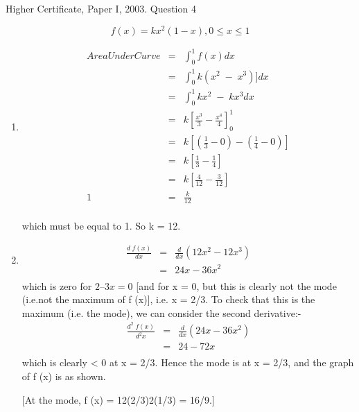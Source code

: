 \documentclass[a4paper,12pt]{article}
\begin{document}
Higher Certificate, Paper I, 2003. Question 4

\[f(x) = kx^2 (1− x) , 0 \leq x \leq 1 \]
\begin{enumerate}
\item 
\begin{eqnarray*}
Area Under Curve &=& \int^{1}_{0} f(x) dx \\
&=& \int^{1}_{0} k(x^2\;-\;x^3)] dx \\
&=& \int^{1}_{0} kx^2\;-\;kx^3 dx \\
&=& k \left[ \frac{x^3}{3} - \frac{x^4}{4}\right]^1_0\\
&=& k \left[ \left( \frac{1}{3}- 0 \right) - \left( \frac{1}{4}- 0 \right)  \right]\\
&=& k \left[  \frac{1}{3} - \frac{1}{4} \right]\\
&=& k \left[  \frac{4}{12} - \frac{3}{12} \right]\\
1 &=&  \frac{k}{12} \\
\end{eqnarray*}

which must be equal to 1. So k = 12.
\item  
\begin{eqnarray*}
\frac{d\;f(x)}{dx} &=& \frac{d}{dx}\left( 12x^2-12x^3 \right)\\
&=&  24x-36x^2 \\
\end{eqnarray*}
which is zero for $2 – 3x = 0$ [and for x = 0, but this is clearly not the mode (i.e.not the maximum of f (x)], i.e. x = 2/3. To check that this is the maximum (i.e.                                                                                                                                                         the mode), we can consider the second derivative:-
\begin{eqnarray*}
\frac{d^2\;f(x)}{d^2x} &=& \frac{d}{dx}\left( 24x-36x^2 \right)\\
&=&  24-72x \\
\end{eqnarray*}
which is clearly < 0 at x = 2/3.
Hence the mode is at x = 2/3, and the graph of f (x) is as shown. 


[At the mode, f (x) = 12(2/3)2(1/3) = 16/9.]




\end{enumerate}
\end{document}

